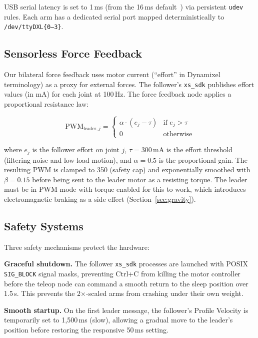 \documentclass[conference]{IEEEtran}
\begin{document}
USB serial latency is set to 1\,ms (from the 16\,ms default~\cite{ftdi_latency}) via persistent \texttt{udev} rules. Each arm has a dedicated serial port mapped deterministically to \texttt{/dev/ttyDXL\{0--3\}}.

\subsection{Sensorless Force Feedback}
\label{sec:force_feedback}

Our bilateral force feedback uses motor current (``effort'' in Dynamixel terminology) as a proxy for external forces. The follower's \texttt{xs\_sdk} publishes effort values (in mA) for each joint at 100\,Hz. The force feedback node applies a proportional resistance law:

\begin{equation}
    \text{PWM}_{\text{leader},j} = \begin{cases}
        \alpha \cdot (e_j - \tau) & \text{if } e_j > \tau \\
        0 & \text{otherwise}
    \end{cases}
    \label{eq:feedback}
\end{equation}

where $e_j$ is the follower effort on joint $j$, $\tau = 300$\,mA is the effort threshold (filtering noise and low-load motion), and $\alpha = 0.5$ is the proportional gain. The resulting PWM is clamped to 350 (safety cap) and exponentially smoothed with $\beta = 0.15$ before being sent to the leader motor as a resisting torque. The leader must be in PWM mode with torque enabled for this to work, which introduces electromagnetic braking as a side effect (Section~\ref{sec:gravity}).

\subsection{Safety Systems}

Three safety mechanisms protect the hardware:

\textbf{Graceful shutdown.} The follower \texttt{xs\_sdk} processes are launched with POSIX \texttt{SIG\_BLOCK} signal masks, preventing Ctrl+C from killing the motor controller before the teleop node can command a smooth return to the sleep position over 1.5\,s. This prevents the 2$\times$-scaled arms from crashing under their own weight.

\textbf{Smooth startup.} On the first leader message, the follower's Profile Velocity is temporarily set to 1,500\,ms (slow), allowing a gradual move to the leader's position before restoring the responsive 50\,ms setting.
\end{document}
